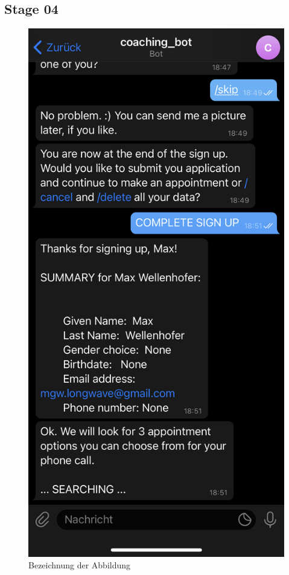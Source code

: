 \subsection{Stage 04}
\begin{figure} %
	\centering
	\includegraphics{images/coaching_bot_dummy_screenshot.jpeg}
	\caption{Bezeichnung der Abbildung}
	\label{a5}
\end{figure}


